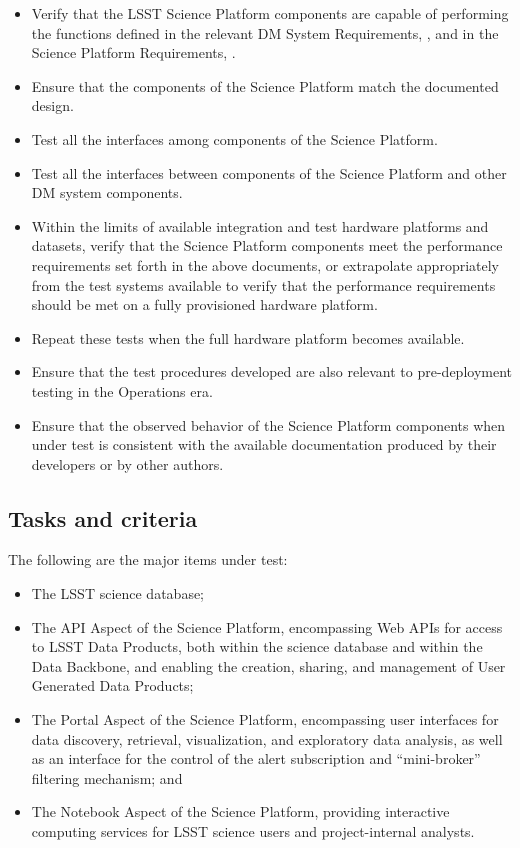 \documentclass[DM,lsstdraft,STS,toc]{lsstdoc}
\begin{document}
\begin{itemize}

\item{Verify that the LSST Science Platform components are capable of performing the functions defined in the relevant DM System Requirements, , and in the Science Platform Requirements, .}
\item{Ensure that the components of the Science Platform match the documented design.}
\item{Test all the interfaces among components of the Science Platform.}
\item{Test all the interfaces between components of the Science Platform and other DM system components.}
\item{Within the limits of available integration and test hardware platforms and datasets, verify that the Science Platform components meet the performance requirements set forth in the above documents, or extrapolate appropriately from the test systems available to verify that the performance requirements should be met on a fully provisioned hardware platform.}
\item{Repeat these tests when the full hardware platform becomes available.}
\item{Ensure that the test procedures developed are also relevant to pre-deployment testing in the Operations era.}
\item{Ensure that the observed behavior of the Science Platform components when under test is consistent with the available documentation produced by their developers or by other authors.}

\end{itemize}

\subsection{Tasks and criteria}
\label{sec:tasks}

The following are the major items under test:

\begin{itemize}

\item{The LSST science database;}
\item{The API Aspect of the Science Platform, encompassing Web APIs for access to LSST Data Products, both within the science database and within the Data Backbone, and enabling the creation, sharing, and management of User Generated Data Products;}
\item{The Portal Aspect of the Science Platform, encompassing user interfaces for data discovery, retrieval, visualization, and exploratory data analysis, as well as an interface for the control of the alert subscription and ``mini-broker'' filtering mechanism; and}
\item{The Notebook Aspect of the Science Platform, providing interactive computing services for LSST science users and project-internal analysts.}

\end{itemize}
\end{document}
